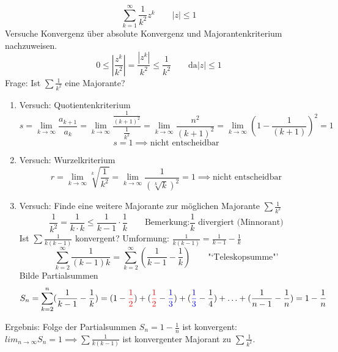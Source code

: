 \begin{example}
	\[
		\sum_{k=1}^\infty \frac{1}{k^2}z^k \qquad |z|\leq1
	\]
	Versuche Konvergenz über absolute Konvergenz und Majorantenkriterium nachzuweisen.
	\[
		0 \leq \left|\frac{z^k}{k^2}\right|=\frac{|z^k|}{k^2}\leq\frac{1}{k^2}\qquad \text{da} |z|\leq1
	\]
	Frage: Ist \( \sum\frac{1}{k^2} \) eine Majorante?
	
	\begin{enumerate}
		\item Versuch: Quotientenkriterium 
		\[
		   s=\lim_{k\rightarrow\infty}\frac{a_{k+1}}{a_k}
			=\lim_{k\rightarrow\infty}\frac{\frac{1}{(k+1)^2}}{\frac{1}{k^2}}
			=\lim_{k\rightarrow\infty}\frac{n^2}{(k+1)^2}
			=\lim_{k\rightarrow\infty}\left(1-\frac{1}{(k+1)}\right)^2 
			= 1 
		\]
		\[
			s = 1 \implies \text{nicht entscheidbar} 
		\]
		\item Versuch: Wurzelkriterium
		\[
		   r=\lim_{k\rightarrow\infty}\sqrt[k]{\frac{1}{k^2}}
			=\lim_{k\rightarrow\infty}\frac{1}{(\sqrt[k]{k})^2}
			= 1 \implies  \text{nicht entscheidbar}
		\]
		\item Versuch: Finde eine weitere Majorante zur möglichen Majorante \( \sum\frac{1}{k^2} \)
		\[
			\frac{1}{k^2}= \frac{1}{k\cdot k}\leq \frac{1}{k-1}\cdot\frac{1}{k} \qquad \text{Bemerkung:}\frac{1}{k} \text{ divergiert (Minnorant)}
		\]
		Ist \( \sum\frac{1}{k(k-1)} \) konvergent? Umformung:
		\(
			\frac{1}{k(k-1)}=\frac{1}{k-1}-\frac{1}{k}
		\)
		\[
			\sum_{k=2}^\infty\frac{1}{(k-1)k}=\sum_{k=2}^\infty(\frac{1}{k-1}-\frac{1}{k}) \qquad \text{"`Teleskopsumme"'}
		\]
		Bilde Partialsummen
		\[
			S_n=\sum_{k=2}^n(\frac{1}{k-1}-\frac{1}{k})=(1-{\color{red}\frac{1}{2}})+({\color{red}\frac{1}{2}}-{\color{blue}\frac{1}{3}})+({\color{blue}\frac{1}{3}}-\frac{1}{4})+\ldots+(\frac{1}{n-1}-\frac{1}{n})=1-\frac{1}{n}
		\]
	\end{enumerate}
	Ergebnis: Folge der Partialsummen \( S_n = 1- \frac{1}{n}\) ist konvergent: \( lim_{n\rightarrow\infty} S_n=1 \implies \sum\frac{1}{k(k-1)} \) ist konvergenter Majorant zu \( \sum\frac{1}{k^2} \).
\end{example}





